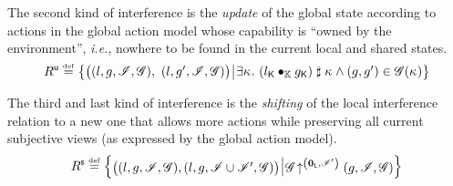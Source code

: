 The second kind of interference is the \emph{update} of the global state according to actions in the global action model whose capability is ``owned by the environment'', \textit{i.e.}, nowhere to be found in the current local and shared states.
%
\[	
  \updateR \eqdef
  \left\{
  \begin{array}{@{} l @{\hspace*{2pt}} | @{\hspace*{2pt}} r @{}}
    \left(
    \begin{array}{@{} l @{}}
      (l, g, \lmod, \gmod),\ 
      (l, g', \lmod, \gmod)
    \end{array}
    \right)
    &
    \begin{array}{@{} l @{} }
      \begin{array}{@{} l @{}}
	\exsts{\ca{} }\left( \capPart{l} \composeCap \capPart{g} \right) \compatible \ca{} \land 
	(g, g') \in \gmod(\ca{}) \\
      \end{array}	
    \end{array}
  \end{array}
  \right\}
\]	

The third and last kind of interference is the \emph{shifting} of the local interference relation to a new one that allows more actions while preserving all current subjective views (as expressed by the global action model).
%
\[
  \shiftR \eqdef
  \left\{
  \begin{array}{@{} l @{\hspace*{2pt}} | @{\hspace*{2pt}} r @{}}
    \left(
    \begin{array}{@{} l @{}}
      (l, g, \lmod, \gmod),
      \left( l, g, \lmod \cup \lmod', \gmod \right)
    \end{array}
    \right)
    &
    \expandsAM{\gmod}{\unitL}{\lmod'}{g}{\lmod}{\gmod}
  \end{array}
  \right\}
\]


